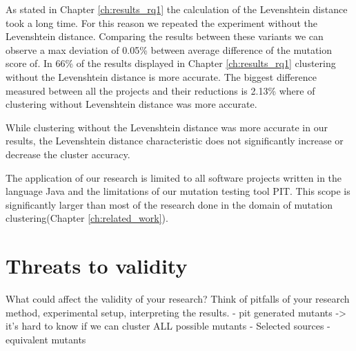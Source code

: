 \documentclass[../main]{subfiles}
\begin{document}
As stated in Chapter \ref{ch:results_rq1} the calculation of the Levenshtein distance took a long time.
For this reason we repeated the experiment without the Levenshtein distance.
Comparing the results between these variants we can observe a max deviation of 0.05\% between average difference of the mutation score of.
In 66\% of the results displayed in Chapter \ref{ch:results_rq1} clustering without the Levenshtein distance is more accurate.
The biggest difference measured between all the projects and their reductions is 2.13\% where of clustering without Levenshtein distance was more accurate.
\begin{finding}
    While clustering without the Levenshtein distance was more accurate in our results, the Levenshtein distance characteristic does not significantly increase or decrease the cluster accuracy.
\end{finding}




The application of our research is limited to all software projects written in the language Java and the limitations of our mutation testing tool PIT\cite{pit}.
This scope is significantly larger than most of the research done in the domain of mutation clustering(Chapter \ref{ch:related_work}).

\section{Threats to validity}
What could affect the validity of your research? Think of pitfalls of your research method, experimental setup, interpreting the results.
- pit generated mutants -> it's hard to know if we can cluster ALL possible mutants
- Selected sources
- equivalent mutants
\end{document}

